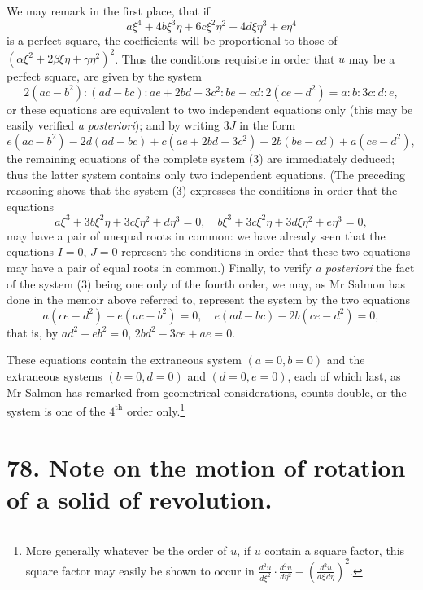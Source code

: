 \documentclass[11pt,a4paper]{book}
\begin{document}
We may remark in the first place, that if
\[
a\xi^{4} + 4b\xi^{3}\eta + 6c\xi^{2}\eta^{2} + 4d\xi\eta^{3} + e\eta^{4}
\]
is a perfect square, the coefficients will be proportional to those of $(\alpha\xi^{2} + 2\beta\xi\eta + \gamma\eta^{2})^{2}$. Thus the conditions requisite in order that $u$ may be a perfect square, are given by the system
\[
2(ac - b^{2}) : (ad - bc) : ae + 2bd - 3c^{2} : be - cd : 2(ce - d^{2}) = a : b : 3c : d : e,
\]
or these equations are equivalent to two independent equations only (this may be easily verified \textit{a posteriori}); and by writing $3J$ in the form
\[
e(ac - b^{2}) - 2d(ad - bc) + c(ae + 2bd - 3c^{2}) - 2b(be - cd) + a(ce - d^{2}),
\]
the remaining equations of the complete system (3) are immediately deduced; thus the latter system contains only two independent equations. (The preceding reasoning shows that the system (3) expresses the conditions in order that the equations
\[
a\xi^{3} + 3b\xi^{2}\eta + 3c\xi\eta^{2} + d\eta^{3} = 0, \quad b\xi^{3} + 3c\xi^{2}\eta + 3d\xi\eta^{2} + e\eta^{3} = 0,
\]
may have a pair of unequal roots in common: we have already seen that the equations $I = 0$, $J = 0$ represent the conditions in order that these two equations may have a pair of equal roots in common.) Finally, to verify \textit{a posteriori} the fact of the system (3) being one only of the fourth order, we may, as Mr Salmon has done in the memoir above referred to, represent the system by the two equations
\[
a(ce - d^{2}) - e(ac - b^{2}) = 0, \quad e(ad - bc) - 2b(ce - d^{2}) = 0,
\]
that is, by $ad^{2} - eb^{2} = 0$, $2bd^{2} - 3ce + ae = 0$.

These equations contain the extraneous system $(a = 0, b = 0)$ and the extraneous systems $(b = 0, d = 0)$ and $(d = 0, e = 0)$, each of which last, as Mr Salmon has remarked from geometrical considerations, counts double, or the system is one of the $4^{\text{th}}$ order only.\footnote{More generally whatever be the order of $u$, if $u$ contain a square factor, this square factor may easily be shown to occur in $\frac{d^{2}u}{d\xi^{2}} \cdot \frac{d^{2}u}{d\eta^{2}} - \left(\frac{d^{2}u}{d\xi\, d\eta}\right)^{2}$.}



\newpage
\section*{78. Note on the motion of rotation of a solid of revolution.}
\end{document}
